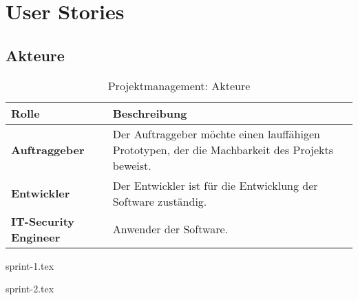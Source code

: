 \newpage
\section{User Stories}
\subsection{Akteure}

\begin{table}[H]
    \centering
    \begin{tabularx}{\textwidth}{| l | X |}
        \hline
        \textbf{Rolle}     & \textbf{Beschreibung}    \\ \hline
        \textbf{Auftraggeber}  & Der Auftraggeber möchte einen lauffähigen Prototypen, der die Machbarkeit des Projekts beweist.  \\ \hline
        \textbf{Entwickler} & Der Entwickler ist für die Entwicklung der Software zuständig.   \\ \hline
        \textbf{IT-Security Engineer} & Anwender der Software.   \\ \hline
    \end{tabularx}
    \caption{Projektmanagement: Akteure}
\end{table}

{sprint-1.tex}

{sprint-2.tex}




